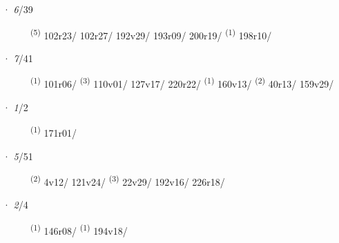 \noindent{} · \textit{6}/39 \LEMMALINE
\begin{description}
    \item[]  \textsuperscript{(5)} \mbox{102r23/} \mbox{102r27/} \mbox{192v29/} \mbox{193r09/} \mbox{200r19/} \textsuperscript{(1)} \mbox{198r10/}
\end{description}
\ENTRYEND
\noindent{} · \textit{7}/41 \LEMMALINE
\begin{description}
    \item[]  \textsuperscript{(1)} \mbox{101r06/} \textsuperscript{(3)} \mbox{110v01/} \mbox{127v17/} \mbox{220r22/} \textsuperscript{(1)} \mbox{160v13/} \CASEBREAK {} \textsuperscript{(2)} \mbox{40r13/} \mbox{159v29/}
\end{description}
\ENTRYEND
\noindent{} · \textit{1}/2 \LEMMALINE
\begin{description}
    \item[]  \textsuperscript{(1)} \mbox{171r01/}
\end{description}
\ENTRYEND
\noindent{} · \textit{5}/51 \LEMMALINE
\begin{description}
    \item[]  \textsuperscript{(2)} \mbox{4v12/} \mbox{121v24/} \CASEBREAK {} \textsuperscript{(3)} \mbox{22v29/} \mbox{192v16/} \mbox{226r18/}
\end{description}
\ENTRYEND
\noindent{} · \textit{2}/4 \LEMMALINE
\begin{description}
    \item[]  \textsuperscript{(1)} \mbox{146r08/} \CASEBREAK {} \textsuperscript{(1)} \mbox{194v18/}
\end{description}

